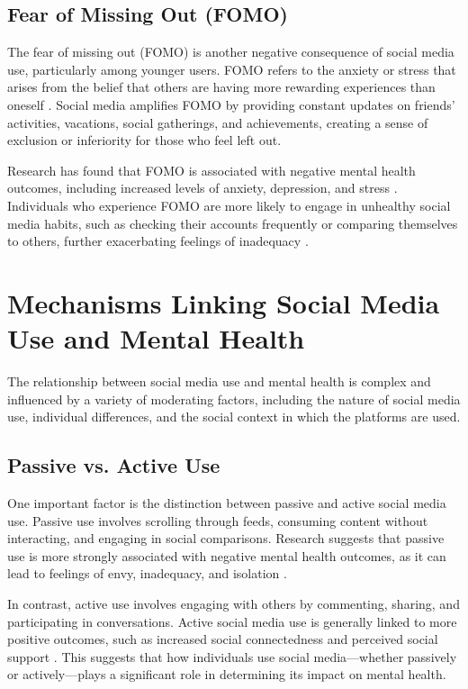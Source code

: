 \documentclass[12pt]{article}
\begin{document}
\subsection{Fear of Missing Out (FOMO)}

The fear of missing out (FOMO) is another negative consequence of social media use, particularly among younger users. FOMO refers to the anxiety or stress that arises from the belief that others are having more rewarding experiences than oneself \cite{przybylski2013}. Social media amplifies FOMO by providing constant updates on friends’ activities, vacations, social gatherings, and achievements, creating a sense of exclusion or inferiority for those who feel left out.

Research has found that FOMO is associated with negative mental health outcomes, including increased levels of anxiety, depression, and stress \cite{przybylski2013}. Individuals who experience FOMO are more likely to engage in unhealthy social media habits, such as checking their accounts frequently or comparing themselves to others, further exacerbating feelings of inadequacy \cite{przybylski2013}.

\section{Mechanisms Linking Social Media Use and Mental Health}

The relationship between social media use and mental health is complex and influenced by a variety of moderating factors, including the nature of social media use, individual differences, and the social context in which the platforms are used.

\subsection{Passive vs. Active Use}

One important factor is the distinction between passive and active social media use. Passive use involves scrolling through feeds, consuming content without interacting, and engaging in social comparisons. Research suggests that passive use is more strongly associated with negative mental health outcomes, as it can lead to feelings of envy, inadequacy, and isolation \cite{gerson2017}.

In contrast, active use involves engaging with others by commenting, sharing, and participating in conversations. Active social media use is generally linked to more positive outcomes, such as increased social connectedness and perceived social support \cite{gerson2017}. This suggests that how individuals use social media—whether passively or actively—plays a significant role in determining its impact on mental health.
\end{document}
